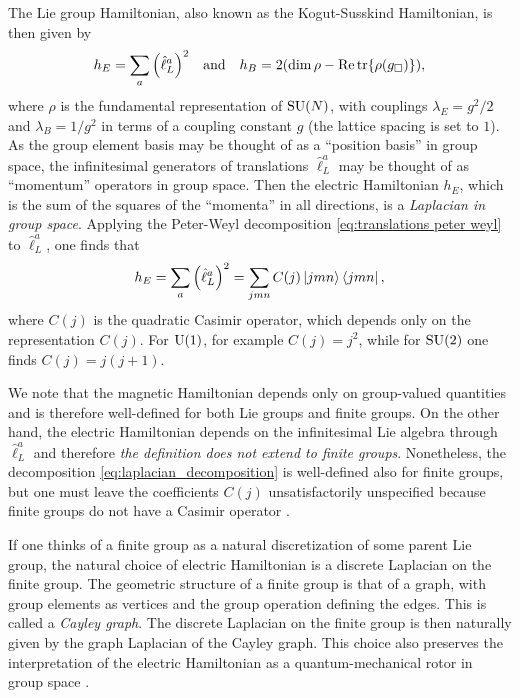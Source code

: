The Lie group Hamiltonian, also known as the Kogut-Susskind Hamiltonian, is then given by \cite{kogut1975hamiltonian, milstead2018qyangmills}
\begin{equation}
    h_E = \sum_{a} \pqty{\hat{\ell}^a_L}^2
    \qand
    h_B = 2(\dim{\rho} - \Re \tr{\rho(g_\square)}),
    \label{eq:kogut_susskind_hE_hB}
\end{equation}
where $\rho$ is the fundamental representation of $\text{SU}(N)$, with couplings $\lambda_E = g^2/2$ and $\lambda_B = 1/g^2$ in terms of a coupling constant $g$ (the lattice spacing is set to $1$).
As the group element basis may be thought of as a ``position basis'' in group space, the infinitesimal generators of translations $\hat{\ell}_L^a$ may be thought of as ``momentum'' operators in group space.
Then the electric Hamiltonian $h_E$, which is the sum of the squares of the ``momenta'' in all directions, is a \emph{Laplacian in group space}.
Applying the Peter-Weyl decomposition \eqref{eq:translations peter weyl} to $\hat{\ell}_L^a$, one finds that \cite{milstead2018qyangmills,marianithesis}
\begin{equation}
    h_E =
    \sum_{a} \pqty{\hat{\ell}^a_L}^2 =
    \sum_{jmn} C(j) \ket{jmn}\bra{jmn},
    \label{eq:laplacian_decomposition}
\end{equation}
where $C(j)$ is the quadratic Casimir operator, which depends only on the representation $C(j)$.
For $\mathrm{U}(1)$, for example $C(j)=j^2$, while for $\text{SU}(2)$ one finds $C(j) = j(j+1)$.

\medskip

We note that the magnetic Hamiltonian depends only on group-valued quantities and is therefore well-defined for both Lie groups and finite groups.
On the other hand, the electric Hamiltonian depends on the infinitesimal Lie algebra through $\hat{\ell}_L^a$ and therefore \emph{the definition does not extend to finite groups}.
Nonetheless, the decomposition \eqref{eq:laplacian_decomposition} is well-defined also for finite groups, but one must leave the coefficients $C(j)$ unsatisfactorily unspecified because finite groups do not have a Casimir operator \cite{zohar2015latticegauge}.

If one thinks of a finite group as a natural discretization of some parent Lie group, the natural choice of electric Hamiltonian is a discrete Laplacian on the finite group.
The geometric structure of a finite group is that of a graph, with group elements as vertices and the group operation defining the edges.
This is called a \textit{Cayley graph}.
The discrete Laplacian on the finite group is then naturally given by the graph Laplacian of the Cayley graph.
This choice also preserves the interpretation of the electric Hamiltonian as a quantum-mechanical rotor in group space \cite{kogut1975hamiltonian}.

